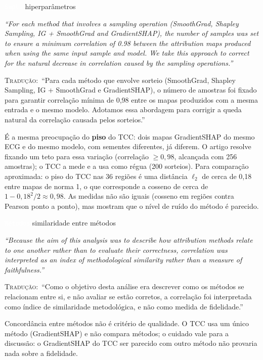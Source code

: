 \documentclass[11pt,a4paper]{article}
\newcommand{\pagechip}[1]{{\setlength{\fboxsep}{1.5pt}\colorbox{cAcc}{\textcolor{white}{\scriptsize\texttt{#1}}}}}
\newenvironment{origquote}{\par\itshape\small}{\par}
\newenvironment{tradquote}{\par\small\textsc{Tradução:}\ }{\par}
\newcommand{\explab}[1]{\par\smallskip{\small\color{cAcc}\textbf{\MakeUppercase{#1}}}\par}
\begin{document}
\begin{citacard}{\pagechip{Supl.} hiperparâmetros}
\begin{origquote}“For each method that involves a sampling operation (SmoothGrad, Shapley Sampling, IG + SmoothGrad and GradientSHAP), the number of samples was set to ensure a minimum correlation of 0.98 between the attribution maps produced when using the same input sample and model. We take this approach to correct for the natural decrease in correlation caused by the sampling operations.”\end{origquote}
\begin{tradquote}“Para cada método que envolve sorteio (SmoothGrad, Shapley Sampling, IG + SmoothGrad e GradientSHAP), o número de amostras foi fixado para garantir correlação mínima de 0,98 entre os mapas produzidos com a mesma entrada e o mesmo modelo. Adotamos essa abordagem para corrigir a queda natural da correlação causada pelos sorteios.”\end{tradquote}
\explab{Explicação}
É a mesma preocupação do \textbf{piso} do TCC: dois mapas GradientSHAP do mesmo ECG e do mesmo modelo, com sementes diferentes, já diferem. O artigo resolve fixando um teto para essa variação (correlação $\geq 0{,}98$, alcançada com 256 amostras); o TCC a mede e a usa como régua (200 sorteios). Para comparação aproximada: o piso do TCC nas 36 regiões é uma distância $\ell_2$ de cerca de 0,18 entre mapas de norma 1, o que corresponde a cosseno de cerca de $1 - 0{,}18^2/2 \approx 0{,}98$. As medidas não são iguais (cosseno em regiões contra Pearson ponto a ponto), mas mostram que o nível de ruído do método é parecido.
\end{citacard}

\begin{citacard}{\pagechip{Métodos} similaridade entre métodos}
\begin{origquote}“Because the aim of this analysis was to describe how attribution methods relate to one another rather than to evaluate their correctness, correlation was interpreted as an index of methodological similarity rather than a measure of faithfulness.”\end{origquote}
\begin{tradquote}“Como o objetivo desta análise era descrever como os métodos se relacionam entre si, e não avaliar se estão corretos, a correlação foi interpretada como índice de similaridade metodológica, e não como medida de fidelidade.”\end{tradquote}
\explab{Explicação}
Concordância entre métodos não é critério de qualidade. O TCC usa um único método (GradientSHAP) e não compara métodos; o cuidado vale para a discussão: o GradientSHAP do TCC ser parecido com outro método não provaria nada sobre a fidelidade.
\end{citacard}
\end{document}
